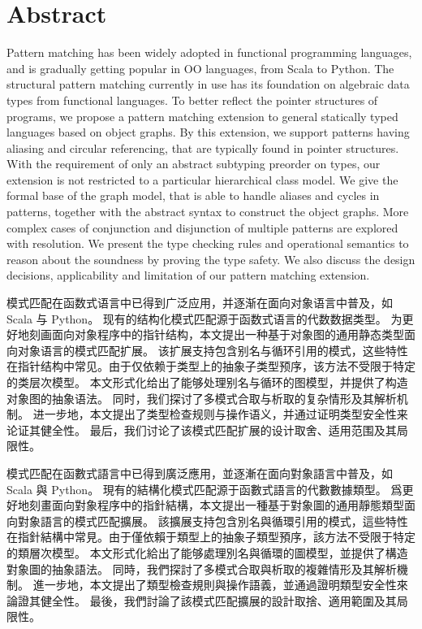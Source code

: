 
\chapter{Abstract}

Pattern matching has been widely adopted in functional programming languages, and is gradually getting popular in \gls{OO} languages, from Scala to Python.
The structural pattern matching currently in use has its foundation on algebraic data types from functional languages.
To better reflect the pointer structures of {\OO} programs, we propose a pattern matching extension to general statically typed {\OO} languages based on object graphs.
By this extension, we support patterns having aliasing and circular referencing, that are typically found in pointer structures.
With the requirement of only an abstract subtyping preorder on types, our extension is not restricted to a particular hierarchical class model.
We give the formal base of the graph model, that is able to handle aliases and cycles in patterns, together with the abstract syntax to construct the object graphs.
More complex cases of conjunction and disjunction of multiple patterns are explored with resolution.
We present the type checking rules and operational semantics to reason about the soundness by proving the type safety.
We also discuss the design decisions, applicability and limitation of our pattern matching extension.

\Keywords{\InsertThesisKeywords}

\begin{ChsAbstract}
模式匹配在函数式语言中已得到广泛应用，并逐渐在面向对象语言中普及，如 Scala 与 Python。
现有的结构化模式匹配源于函数式语言的代数数据类型。
为更好地刻画面向对象程序中的指针结构，本文提出一种基于对象图的通用静态类型面向对象语言的模式匹配扩展。
该扩展支持包含别名与循环引用的模式，这些特性在指针结构中常见。由于仅依赖于类型上的抽象子类型预序，该方法不受限于特定的类层次模型。
本文形式化给出了能够处理别名与循环的图模型，并提供了构造对象图的抽象语法。
同时，我们探讨了多模式合取与析取的复杂情形及其解析机制。
进一步地，本文提出了类型检查规则与操作语义，并通过证明类型安全性来论证其健全性。
最后，我们讨论了该模式匹配扩展的设计取舍、适用范围及其局限性。
\end{ChsAbstract}

\ChsKeywords{\InsertThesisChsKeywords}

\begin{ChtAbstract}
模式匹配在函數式語言中已得到廣泛應用，並逐漸在面向對象語言中普及，如 Scala 與 Python。
現有的結構化模式匹配源于函數式語言的代數數據類型。
爲更好地刻畫面向對象程序中的指針結構，本文提出一種基于對象圖的通用靜態類型面向對象語言的模式匹配擴展。
該擴展支持包含別名與循環引用的模式，這些特性在指針結構中常見。由于僅依賴于類型上的抽象子類型預序，該方法不受限于特定的類層次模型。
本文形式化給出了能够處理別名與循環的圖模型，並提供了構造對象圖的抽象語法。
同時，我們探討了多模式合取與析取的複雜情形及其解析機制。
進一步地，本文提出了類型檢查規則與操作語義，並通過證明類型安全性來論證其健全性。
最後，我們討論了該模式匹配擴展的設計取捨、適用範圍及其局限性。
\end{ChtAbstract}

\ChtKeywords{\InsertThesisChtKeywords}

\endinput